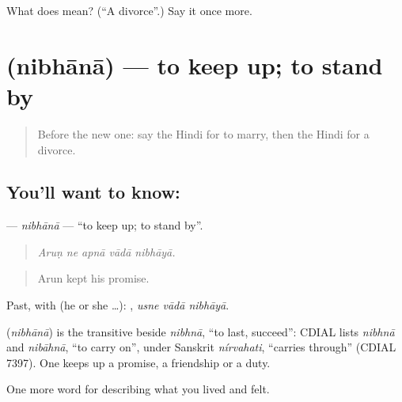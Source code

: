 \begin{tcolorbox}[breakable,colback=teal!4,colframe=teal!35!black,title={Before you move on}]
What does  mean? (\textquotedblleft{}A divorce\textquotedblright{}.) Say it once more.
\end{tcolorbox}
\section[\texorpdfstring{\hi{निभाना} (nibhānā)}{निभाना (nibhānā)}]{ (nibhānā) — to keep up; to stand by}

\label{lesson:HI-C501-nibhana}



\begin{quote}
Before the new one: say the Hindi for to marry, then the Hindi for a divorce.
\end{quote}

\subsection*{You'll want to know: }
\textbf{} — \emph{nibhānā} — \textquotedblleft{}to keep up; to stand by\textquotedblright{}.

\begin{quote}
    
\end{quote}

\begin{quote}
\emph{Aruṇ ne apnā vādā nibhāyā.}
\end{quote}

\begin{quote}
Arun kept his promise.
\end{quote}

Past, with  (he or she …):   , \emph{usne vādā nibhāyā}.

\begin{cousinweb}
\textbf{} (\emph{nibhānā}) is the transitive beside \emph{nibhnā}, \textquotedblleft{}to last, succeed\textquotedblright{}: CDIAL lists \emph{nibhnā} and \emph{nibāhnā}, \textquotedblleft{}to carry on\textquotedblright{}, under Sanskrit \emph{nírvahati}, \textquotedblleft{}carries through\textquotedblright{} (CDIAL 7397). One keeps up a promise, a friendship or a duty.
\end{cousinweb}

\begin{grammarlens}[title={What you've built}]
One more word for describing what you lived and felt.
\end{grammarlens}

